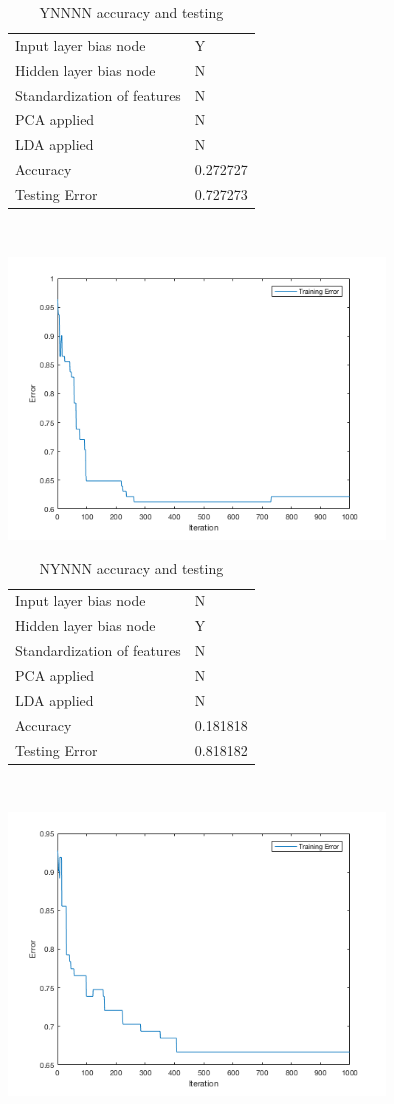 \documentclass[12pt]{article}
\newcommand{\accuracyAndTestErrorTable}[8]{
  \begin{tabular}{l|l}
    \hline
    Input layer bias node & #1 \\
    Hidden layer bias node & #2 \\
    Standardization of features & #3 \\
    PCA applied & #4 \\
    LDA applied & #5 \\
    \hline
    Accuracy & #6 \\
    Testing Error & #7 \\
    \hline
  \end{tabular}
  ~\\[60pt]
  \caption{#8}
}
\begin{document}
\begin{center}
  \begin{table}[H]
    \begin{varwidth}[b]{0.4\linewidth}
      \centering
      \accuracyAndTestErrorTable{Y}{N}{N}{N}{N}{0.272727}{0.727273}{YNNNN accuracy and testing}
      \label{table:YNNNN}
    \end{varwidth}%
    \hfill
    \begin{minipage}[b]{0.6\linewidth}
      \centering
      \includegraphics[width=100mm]{YNNNN_training_error.png}
      \label{fig:YNNNN}
    \end{minipage}
  \end{table}
\end{center}


\begin{center}
  \begin{table}[H]
    \begin{varwidth}[b]{0.4\linewidth}
      \centering
      \accuracyAndTestErrorTable{N}{Y}{N}{N}{N}{0.181818}{0.818182}{NYNNN accuracy and testing}
      \label{table:NYNNN}
    \end{varwidth}%
    \hfill
    \begin{minipage}[b]{0.6\linewidth}
      \centering
      \includegraphics[width=100mm]{NYNNN_training_error.png}
      \label{fig:NYNNN}
    \end{minipage}
  \end{table}
\end{center}
\end{document}
